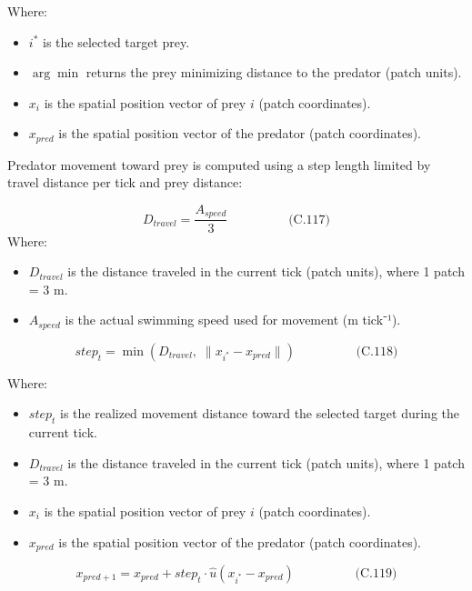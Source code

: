 \documentclass[
]{book}
\providecommand{\tightlist}{%
  \setlength{\itemsep}{0pt}\setlength{\parskip}{0pt}}
\begin{document}
Where:

\begin{itemize}
\tightlist
\item
  \(i^*\) is the selected target prey.
\item
  \(\arg\min\) returns the prey minimizing distance to the predator
  (patch units).
\item
  \(x_i\) is the spatial position vector of prey \(i\) (patch
  coordinates).
\item
  \(x_{pred}\) is the spatial position vector of the predator (patch
  coordinates).
\end{itemize}

Predator movement toward prey is computed using a step length limited by
travel distance per tick and prey distance:

\[
\begin{equation} D_{travel} = \frac{A_{speed}}{3}  \hspace{2cm} \text{(C.117)} \end{equation}
\] Where:

\begin{itemize}
\tightlist
\item
  \(D_{travel}\) is the distance traveled in the current tick (patch
  units), where 1 patch = 3 m.
\item
  \(A_{speed}\) is the actual swimming speed used for movement (m
  tick⁻¹).
\end{itemize}

\[
\begin{equation} step_t = \min(D_{travel},\; \|x_{i^*} - x_{pred}\|)  \hspace{2cm} \text{(C.118)} \end{equation}
\]

Where:

\begin{itemize}
\tightlist
\item
  \(step_{t}\) is the realized movement distance toward the selected
  target during the current tick.
\item
  \(D_{travel}\) is the distance traveled in the current tick (patch
  units), where 1 patch = 3 m.
\item
  \(x_i\) is the spatial position vector of prey \(i\) (patch
  coordinates).
\item
  \(x_{pred}\) is the spatial position vector of the predator (patch
  coordinates).
\end{itemize}

\[
\begin{equation} x_{pred+1} = x_{pred} + step_t \cdot \hat{u}(x_{i^*} - x_{pred})  \hspace{2cm} \text{(C.119)} \end{equation}
\]
\end{document}
